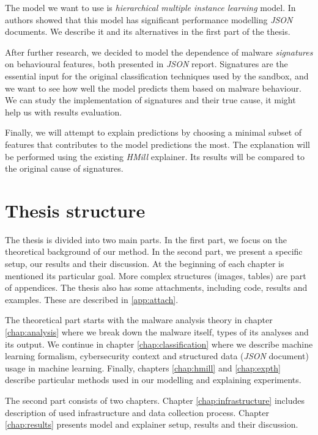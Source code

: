 The model we want to use is \emph{hierarchical multiple instance learning} model. In \cite{Mandlik2020} authors showed that this model has significant performance modelling \emph{JSON} documents. We describe it and its alternatives in the first part of the thesis. 

After further research, we decided to model the dependence of malware \emph{signatures} on behavioural features, both presented in \emph{JSON} report. Signatures are the essential input for the original classification techniques used by the sandbox, and we want to see how well the model predicts them based on malware behaviour. We can study the implementation of signatures and their true cause, it might help us with results evaluation.

Finally, we will attempt to explain predictions by choosing a minimal subset of features that contributes to the model predictions the most. The explanation will be performed using the existing \emph{HMill} explainer. Its results will be compared to the original cause of signatures.

\section*{Thesis structure}
The thesis is divided into two main parts. In the first part, we focus on the theoretical background of our method. In the second part, we present a specific setup, our results and their discussion. At the beginning of each chapter is mentioned its particular goal. More complex structures (images, tables) are part of appendices. The thesis also has some attachments, including code, results and examples. These are described in \ref{app:attach}.

The theoretical part starts with the malware analysis theory in chapter \ref{chap:analysis} where we break down the malware itself, types of its analyses and its output. We continue in chapter \ref{chap:classification} where we describe machine learning formalism, cybersecurity context and structured data (\emph{JSON} document) usage in machine learning. Finally, chapters \ref{chap:hmill} and \ref{chap:expth} describe particular methods used in our modelling and explaining experiments.

The second part consists of two chapters. Chapter \ref{chap:infrastructure} includes description of used infrastructure and data collection process. Chapter \ref{chap:results} presents model and explainer setup, results and their discussion.




